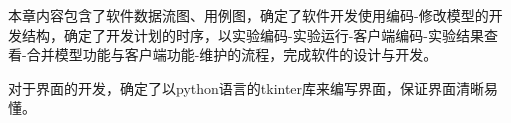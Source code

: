 本章内容包含了软件数据流图、用例图，确定了软件开发使用编码-修改模型的开发结构，确定了开发计划的时序，以实验编码-实验运行-客户端编码-实验结果查看-合并模型功能与客户端功能-维护的流程，完成软件的设计与开发。

对于界面的开发，确定了以python语言的tkinter库来编写界面，保证界面清晰易懂。




